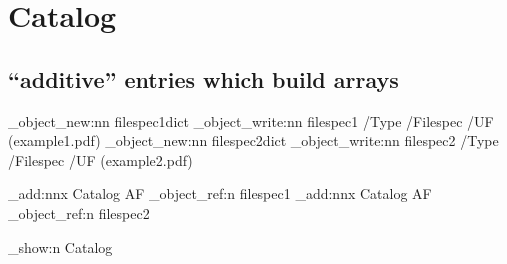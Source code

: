 \documentclass{article}
\begin{document}
\Form {}
\section{Catalog}
\subsection{\enquote{additive} entries which build arrays}
\ExplSyntaxOn
\pdf_object_new:nn   {filespec1}{dict}
\pdf_object_write:nn {filespec1} {/Type /Filespec /UF (example1.pdf)}
\pdf_object_new:nn   {filespec2}{dict}
\pdf_object_write:nn {filespec2} {/Type /Filespec /UF (example2.pdf)}

\pdfmanagement_add:nnx { Catalog } {AF} {\pdf_object_ref:n {filespec1}}
\pdfmanagement_add:nnx { Catalog } {AF} {\pdf_object_ref:n {filespec2}}

\pdfmanagement_show:n {Catalog} %

\ExplSyntaxOff
\end{document}

